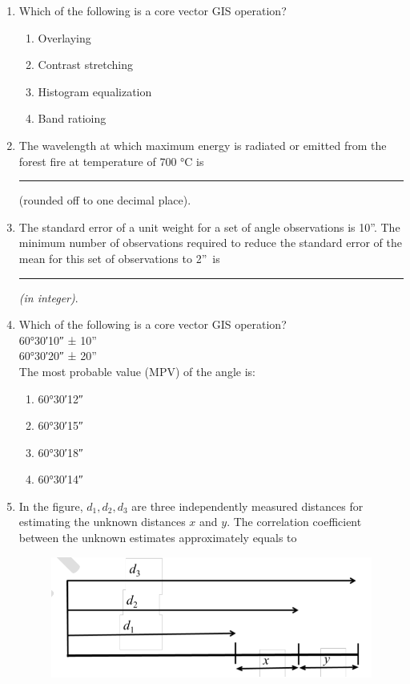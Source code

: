 \documentclass[12pt]{article}
\begin{document}
\begin{enumerate}
\item Which of the following is a core vector GIS operation?

\begin{enumerate}
    \item Overlaying 
   \item Contrast stretching 
   \item Histogram equalization 
   \item Band ratioing
\end{enumerate}

\item The wavelength at which maximum energy is radiated or emitted from the forest
fire at temperature of 700 °C is \rule{2cm}{0.15mm} (rounded off to one decimal place).

\item The standard error of a unit weight for a set of angle observations is 10\textquotedblright.
The minimum number of observations required to reduce the standard error of the
mean for this set of observations to 2\textquotedblright\ is  \rule{2cm}{0.15mm} \textit{(in integer)}.

\item  Which of the following is a core vector GIS operation?\\
      \ang{60;30;10} ± 10''\\  
      \ang{60;30;20} ± 20''\\
     The most probable value (MPV) of the angle is: 

\begin{enumerate}
    \item \ang{60;30;12} 
   \item \ang{60;30;15}  
   \item \ang{60;30;18} 
   \item \ang{60;30;14} 
\end{enumerate}

\item In the figure, $d_1, d_2, d_3$ are three independently measured distances for estimating
the unknown distances $x$ and $y$. The correlation coefficient between the unknown
estimates approximately equals to  

\begin{figure}[H]
\centering
\includegraphics[width=0.5\linewidth]{Figs/LatexImage4.png}
\end{figure} \\


\end{enumerate}
\end{document}
